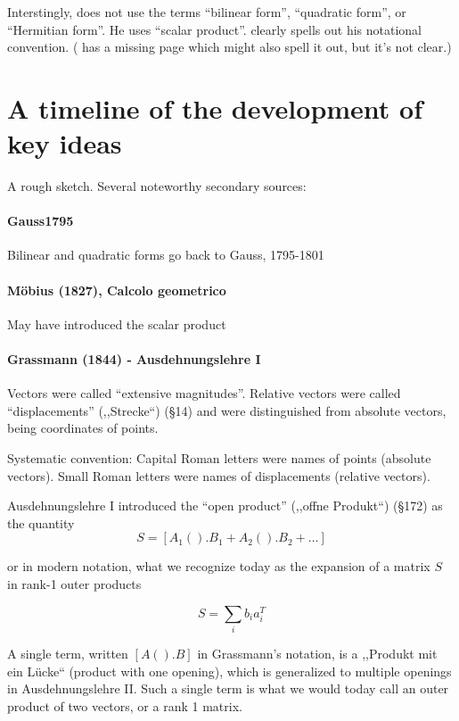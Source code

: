 Interstingly, \cite{Householder1953} does not use the terms ``bilinear form'', ``quadratic form'', or ``Hermitian form''. He uses ``scalar product''. \cite{Householder1955} clearly spells out his notational convention. (\cite{Householder1953} has a missing page which might also spell it out, but it's not clear.)



\section{A timeline of the development of key ideas}

A rough sketch.
Several noteworthy secondary sources:~\cite{Parshall1985,Kleiner2007,Higham2009}

\paragraph{Gauss1795}

Bilinear and quadratic forms go back to Gauss, 1795-1801

\paragraph{Möbius (1827), Calcolo geometrico}

May have introduced the scalar product

\paragraph{Grassmann (1844) - Ausdehnungslehre I~\cite{Grassmann1844,Grassmann1995}}

Vectors were called ``extensive magnitudes''. Relative vectors were called ``displacements'' (,,Strecke``) (\S 14) and were distinguished from absolute vectors, being coordinates of points.

Systematic convention: Capital Roman letters were names of points (absolute vectors). Small Roman letters were names of displacements (relative vectors).

Ausdehnungslehre I introduced the ``open product'' (,,offne Produkt``) (\S 172) as the quantity
\[
S = [A_1().B_1 + A_2().B_2 + \dots]
\]

or in modern notation, what we recognize today as the expansion of a matrix $S$ in rank-1 outer products

\[
S = \sum_i b_i a_i^T
\]

A single term, written $[A().B]$ in Grassmann's notation, is a ,,Produkt mit ein Lücke`` (product with one opening), which is generalized to multiple openings in Ausdehnungslehre II. Such a single term is what we would today call an outer product of two vectors, or a rank 1 matrix.

